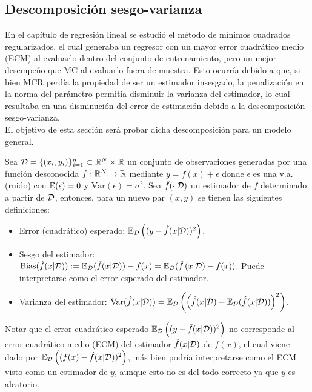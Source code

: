 \subsection{Descomposición sesgo-varianza}

En el capítulo de regresión lineal se estudió el método de mínimos cuadrados regularizados, el cual generaba un regresor con un mayor error cuadrático medio (ECM) al evaluarlo dentro del conjunto de entrenamiento, pero un mejor desempeño que MC al evaluarlo fuera de muestra. Esto ocurría debido a que, si bien MCR perdía la propiedad de ser un estimador insesgado, la penalización en la norma del parámetro permitía disminuir la varianza del estimador, lo cual resultaba en una disminución del error de estimación debido a la descomposición sesgo-varianza.\\

El objetivo de esta sección será probar dicha descomposición para un modelo general.



\begin{definition}
	Sea ${\mathcal D}=\{(x_i,y_i)\}_{i=1}^n\subset\mathbb{R}^N\times\mathbb{R}$ un conjunto de observaciones generadas por una función desconocida $f:\mathbb{R}^N\to\mathbb{R}$ mediante $y=f(x)+\epsilon$ donde $\epsilon$ es una v.a. (ruido) con $\operatorname{\mathbb{E}}(\epsilon)=0$ y $\text{Var}(\epsilon)=\sigma^2$. Sea $\hat{f}(\cdot|{\mathcal D})$ un estimador de $f$ determinado a partir de ${\mathcal D}$, entonces, para un nuevo par $(x,y)$ se tienen las siguientes definiciones:
	
	\begin{itemize}
		\item Error (cuadrático) esperado: $\operatorname{\mathbb{E}}_{\mathcal D}\left((y-\hat{f}(x|{\mathcal D}))^2\right)$.
		\item Sesgo del estimador: $\text{Bias}(\hat{f}(x|{\mathcal D})):= \operatorname{\mathbb{E}}_{\mathcal D}(\hat{f}(x|{\mathcal D})) - f(x) = \operatorname{\mathbb{E}}_{\mathcal D}(\hat{f}\left(x|{\mathcal D}) - f(x)\right)$. Puede interpretarse como el error esperado del estimador.
		\item Varianza del estimador: $\text{Var}(\hat{f}(x|{\mathcal D})) = \operatorname{\mathbb{E}}_{\mathcal D}\left(\left(\hat{f}(x|{\mathcal D})-\operatorname{\mathbb{E}}_{\mathcal D}(\hat{f}(x|{\mathcal D}))\right)^2\right)$.
		
	\end{itemize}
\end{definition}

\begin{remark}
Notar que el error cuadrático esperado $\operatorname{\mathbb{E}}_{\mathcal D}\left((y-\hat{f}(x|{\mathcal D}))^2\right)$ no corresponde al error cuadrático medio (ECM) del estimador $\hat{f}(x|{\mathcal D})$ de $f(x)$, el cual viene dado por $\operatorname{\mathbb{E}}_{\mathcal D}\left((f(x)-\hat{f}(x|{\mathcal D}))^2\right)$, más bien podría interpretarse como el ECM visto como un estimador de $y$, aunque esto no es del todo correcto ya que $y$ es aleatorio.
\end{remark}

